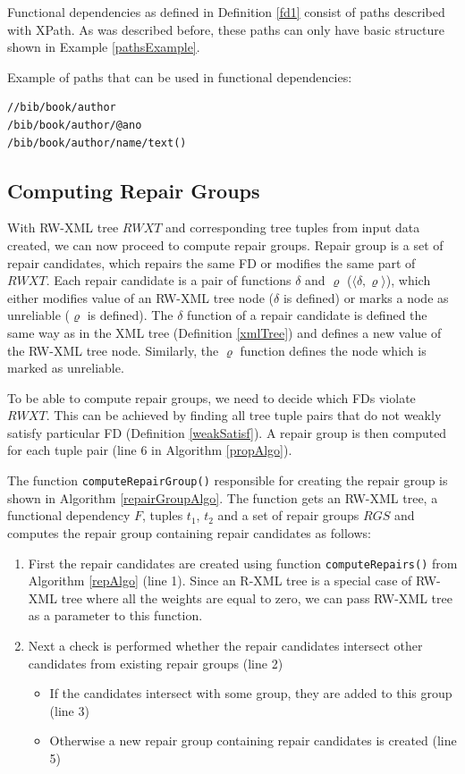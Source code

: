 Functional dependencies as defined in Definition \ref{fd1} consist of paths described with XPath. As was described before, these paths can only have basic structure shown in Example \ref{pathsExample}.

\begin{example}\label{pathsExample}
Example of paths that can be used in functional dependencies:
\begin{verbatim}
//bib/book/author
/bib/book/author/@ano
/bib/book/author/name/text()
\end{verbatim}
\end{example}

\subsection{Computing Repair Groups}

With RW-XML tree $RWXT$ and corresponding tree tuples from input data created, we can now proceed to compute repair groups. Repair group is a set of repair candidates, which repairs the same FD or modifies the same part of $RWXT$. Each repair candidate is a pair of functions $\delta$ and $\varrho$ ($\langle \delta, \varrho \rangle$), which either modifies value of an RW-XML tree node ($\delta$ is defined) or marks a node as unreliable ($\varrho$ is defined). The $\delta$ function of a repair candidate is defined the same way as in the XML tree (Definition \ref{xmlTree}) and defines a new value of the RW-XML tree node. Similarly, the $\varrho$ function defines the node which is marked as unreliable.

To be able to compute repair groups, we need to decide which FDs violate $RWXT$. This can be achieved by finding all tree tuple pairs that do not weakly satisfy particular FD (Definition \ref{weakSatisf}). A repair group is then computed for each tuple pair (line 6 in Algorithm \ref{propAlgo}).

The function \texttt{computeRepairGroup()} responsible for creating the repair group is shown in Algorithm \ref{repairGroupAlgo}. The function gets an RW-XML tree, a functional dependency $F$, tuples $t_1$, $t_2$ and a set of repair groups $RGS$ and computes the repair group containing repair candidates as follows:

\begin{enumerate}
	\item First the repair candidates are created using function \texttt{computeRepairs()} from Algorithm \ref{repAlgo} (line 1). Since an R-XML tree is a special case of RW-XML tree where all the weights are equal to zero, we can pass RW-XML tree as a parameter to this function.
    \item Next a check is performed whether the repair candidates intersect other candidates from existing repair groups (line 2)
    \begin{itemize}
    	\item If the candidates intersect with some group, they are added to this group (line 3)
        \item Otherwise a new repair group containing repair candidates is created (line 5)
    \end{itemize}
\end{enumerate}

